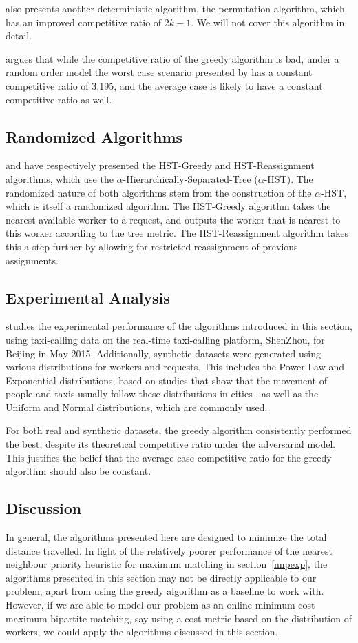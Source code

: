 \documentclass[urop]{socreport}
\begin{document}
\cite{greedy} also presents another deterministic algorithm, the permutation algorithm, which has an improved competitive ratio of $2k -1$. We will not cover this algorithm in detail.

\cite{tong} argues that while the competitive ratio of the greedy algorithm is bad, under a random order model the worst case scenario presented by \cite{greedy} has a constant competitive ratio of 3.195, and the average case is likely to have a constant competitive ratio as well.

\subsection{Randomized Algorithms}
\cite{hst-g} and \cite{hst-re} have respectively presented the HST-Greedy and HST-Reassignment algorithms, which use the $\alpha$-Hierarchically-Separated-Tree ($\alpha$-HST). The randomized nature of both algorithms stem from the construction of the $\alpha$-HST, which is itself a randomized algorithm. The HST-Greedy algorithm takes the nearest available worker to a request, and outputs the worker that is nearest to this worker according to the tree metric. The HST-Reassignment algorithm takes this a step further by allowing for restricted reassignment of previous assignments.

\subsection{Experimental Analysis}
\cite{tong} studies the experimental performance of the algorithms introduced in this section, using taxi-calling data on the real-time taxi-calling platform, ShenZhou, for Beijing in May 2015. Additionally, synthetic datasets were generated using various distributions for workers and requests. This includes the Power-Law and Exponential distributions, based on studies that show that the movement of people and taxis usually follow these distributions in cities \cite{dist1,dist2}, as well as the Uniform and Normal distributions, which are commonly used.

For both real and synthetic datasets, the greedy algorithm consistently performed the best, despite its theoretical competitive ratio under the adversarial model. This justifies the belief that the average case competitive ratio for the greedy algorithm should also be constant.

\subsection{Discussion}
In general, the algorithms presented here are designed to minimize the total distance travelled. In light of the relatively poorer performance of the nearest neighbour priority heuristic for maximum matching in section~\ref{nnpexp}, the algorithms presented in this section may not be directly applicable to our problem, apart from using the greedy algorithm as a baseline to work with. However, if we are able to model our problem as an online minimum cost maximum bipartite matching, say using a cost metric based on the distribution of workers, we could apply the algorithms discussed in this section.
\end{document}
